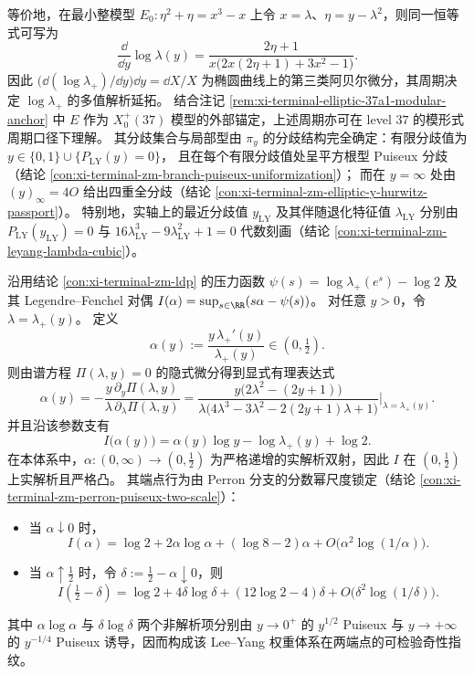 \begin{remark}
\[\]
等价地，在最小整模型 \(E_0:\eta^2+\eta=x^3-x\) 上令 \(x=\lambda\)、\(\eta=y-\lambda^2\)，则同一恒等式可写为
\[
\frac{\dd}{\dd y}\log \lambda(y)
=\frac{2\eta+1}{x\bigl(2x(2\eta+1)+3x^2-1\bigr)}.
\]
因此 \(\bigl(\dd(\log\lambda_+)/\dd y\bigr)\dd y=\dd X/X\) 为椭圆曲线上的第三类阿贝尔微分，其周期决定 \(\log\lambda_+\) 的多值解析延拓。
结合注记 \ref{rem:xi-terminal-elliptic-37a1-modular-anchor} 中 \(E\) 作为 \(X_0^+(37)\) 模型的外部锚定，上述周期亦可在 level \(37\) 的模形式周期口径下理解。
其分歧集合与局部型由 \(\pi_y\) 的分歧结构完全确定：有限分歧值为
\(
y\in\{0,1\}\cup\{P_{\mathrm{LY}}(y)=0\}
\)，
且在每个有限分歧值处呈平方根型 Puiseux 分歧（结论 \ref{con:xi-terminal-zm-branch-puiseux-uniformization}）；
而在 \(y=\infty\) 处由 \((y)_\infty=4O\) 给出四重全分歧（结论 \ref{con:xi-terminal-zm-elliptic-y-hurwitz-passport}）。
特别地，实轴上的最近分歧值 \(y_{\mathrm{LY}}\) 及其伴随退化特征值 \(\lambda_{\mathrm{LY}}\) 分别由
\(
P_{\mathrm{LY}}(y_{\mathrm{LY}})=0
\)
与
\(
16\lambda_{\mathrm{LY}}^{3}-9\lambda_{\mathrm{LY}}^{2}+1=0
\)
代数刻画（结论 \ref{con:xi-terminal-zm-leyang-lambda-cubic}）。
\end{remark}

\begin{conclusion}[大偏差速率函数的代数参数化与端点对数奇性]\label{con:xi-terminal-zm-ldp-rate-algebraic-param-endpoint-log}
沿用结论 \ref{con:xi-terminal-zm-ldp} 的压力函数
\(
\psi(s)=\log\lambda_{+}(e^{s})-\log2
\)
及其 Legendre--Fenchel 对偶 \(I(\alpha)=\sup_{s\in\RR}(s\alpha-\psi(s))\)。
对任意 \(y>0\)，令 \(\lambda=\lambda_{+}(y)\)。
定义
\[
\alpha(y):=\frac{y\,\lambda_{+}'(y)}{\lambda_{+}(y)}\in(0,\tfrac12).
\]
则由谱方程 \(\Pi(\lambda,y)=0\) 的隐式微分得到显式有理表达式
\[
\alpha(y)
=-\frac{y\,\partial_y\Pi(\lambda,y)}{\lambda\,\partial_{\lambda}\Pi(\lambda,y)}
=\frac{y\bigl(2\lambda^{2}-(2y+1)\bigr)}{\lambda\bigl(4\lambda^{3}-3\lambda^{2}-2(2y+1)\lambda+1\bigr)}
\Big|_{\lambda=\lambda_{+}(y)}.
\]
并且沿该参数支有
\[
I\bigl(\alpha(y)\bigr)=\alpha(y)\log y-\log\lambda_{+}(y)+\log2.
\]
在本体系中，\(\alpha:(0,\infty)\to(0,\tfrac12)\) 为严格递增的实解析双射，因此 \(I\) 在 \((0,\tfrac12)\) 上实解析且严格凸。
其端点行为由 Perron 分支的分数幂尺度锁定（结论 \ref{con:xi-terminal-zm-perron-puiseux-two-scale}）：
\begin{itemize}
  \item 当 \(\alpha\downarrow0\) 时，
  \[
  I(\alpha)
  =\log2+2\alpha\log\alpha+(\log8-2)\alpha+O\!\bigl(\alpha^{2}\log(1/\alpha)\bigr).
  \]
  \item 当 \(\alpha\uparrow\tfrac12\) 时，令 \(\delta:=\tfrac12-\alpha\downarrow0\)，则
  \[
  I\!\left(\tfrac12-\delta\right)
  =\log2+4\delta\log\delta+(12\log2-4)\delta+O\!\bigl(\delta^{2}\log(1/\delta)\bigr).
  \]
\end{itemize}
其中 \(\alpha\log\alpha\) 与 \(\delta\log\delta\) 两个非解析项分别由 \(y\to0^{+}\) 的 \(y^{1/2}\) Puiseux 与 \(y\to+\infty\) 的 \(y^{-1/4}\) Puiseux 诱导，因而构成该 Lee--Yang 权重体系在两端点的可检验奇性指纹。
\end{conclusion}

